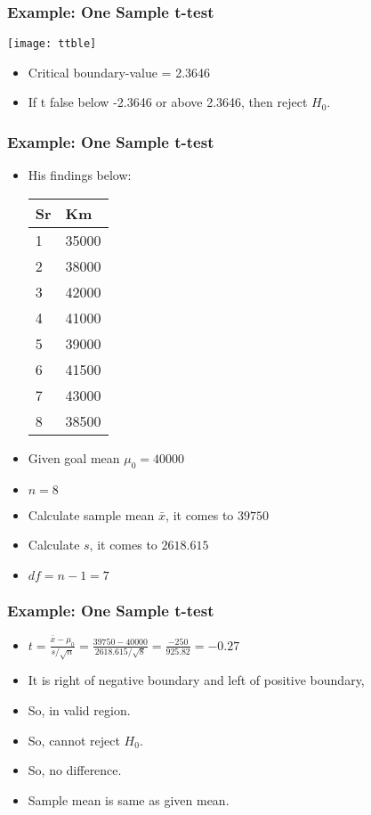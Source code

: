 \begin{frame}[fragile]\frametitle{Example: One Sample t-test}
\begin{center}
\texttt{[image: ttble]}
\end{center}
\begin{itemize}
\item Critical boundary-value = 2.3646
\item If t false below -2.3646 or above 2.3646, then reject $H_0$.
\end{itemize}
\end{frame}



\begin{frame}[fragile]\frametitle{Example: One Sample t-test}

\begin{itemize}
\item  His findings below:
 
\begin{tabular}{l|l}
Sr	&Km\\ \hline
1 & 35000\\
2 & 38000\\
3 & 42000\\
4 & 41000\\
5 & 39000\\
6 & 41500\\
7 & 43000\\
8 & 38500\\
\end{tabular}
\item Given goal mean $\mu_0 = 40000$
\item $n = 8$
\item Calculate sample mean $\bar{x}$, it comes to $39750$
\item Calculate $s$, it comes to $2618.615$
\item $df = n -1 = 7$
\end{itemize}
\end{frame}

\begin{frame}[fragile]\frametitle{Example: One Sample t-test}

\begin{itemize}
\item $t = \frac{\bar{x} - \mu_0}{s /\sqrt{n}} = \frac{39750 - 40000}{2618.615 /\sqrt{8}} = \frac{-250}{925.82} = - 0.27$
\item It is right of negative boundary and left of positive boundary, 
\item So, in valid region.
\item So, cannot reject $H_0$. 
\item So, no difference. 
\item Sample mean is same as given mean.
\end{itemize}
\end{frame}


